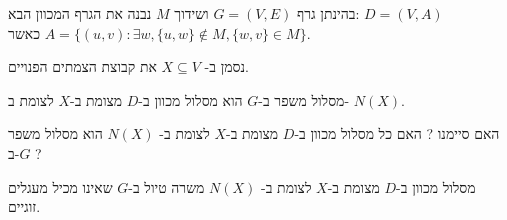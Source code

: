 בהינתן גרף 
$G = (V, E)$
ושידוך $M$ נבנה את הגרף המכוון הבא:
$D = (V, A)$
\\
כאשר 
$A = \{(u, v) : \exists w, \{u, w\} \notin M, \{w, v\} \in M\}$.
\begin{figure}[h]
\centering

\end{figure}
נסמן ב-%
$X \subseteq V$
את קבוצת הצמתים הפנויים.
\begin{claim}
מסלול משפר ב-$G$ הוא מסלול מכוון ב-$D$ מצומת ב-$X$ לצומת ב-%
$N(X)$.
\end{claim}
האם סיימנו ? האם כל מסלול מכוון ב-$D$ מצומת ב-$X$ לצומת ב-%
$N(X)$
הוא מסלול משפר ב-$G$ ?
\begin{claim}
מסלול מכוון ב-$D$ מצומת ב-$X$ לצומת ב-%
$N(X)$
משרה טיול ב-$G$ שאינו מכיל מעגלים זוגיים.
\end{claim}

\begin{figure}[h]
\centering

\end{figure}
